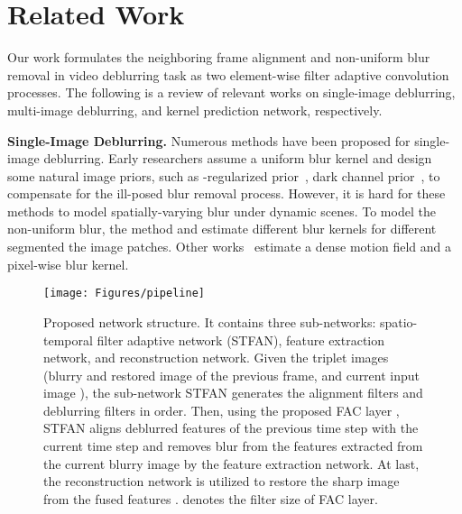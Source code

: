 \documentclass[10pt,twocolumn,letterpaper]{article}
\begin{document}
\section{Related Work}
Our work formulates the neighboring frame alignment and non-uniform blur removal in video deblurring task as two element-wise filter adaptive convolution processes.
The following is a review of relevant works on single-image deblurring, multi-image deblurring, and kernel prediction network, respectively.


\noindent \textbf{Single-Image Deblurring.}
Numerous methods have been proposed for single-image deblurring. Early researchers assume a uniform blur kernel and design some natural image priors, such as -regularized prior~\cite{xu2013unnatural}, dark channel prior~\cite{pan2016blind}, to compensate for the ill-posed blur removal process.
However, it is hard for these methods to model spatially-varying blur under dynamic scenes.
To model the non-uniform blur, the method \cite{hyun2013dynamic} and \cite{pan2016soft} estimate different blur kernels for different segmented the image patches.
Other works~\cite{gong2017motion, sun2015learning, hyun2014segmentation} estimate a dense motion field and a pixel-wise blur kernel.
\begin{figure*}[!]
\centering
\resizebox{0.97\linewidth}{!} {
	\texttt{[image: Figures/pipeline]}
}
\vspace{0mm}
\caption{Proposed network structure. It contains three sub-networks: spatio-temporal filter adaptive network (STFAN), feature extraction network, and reconstruction network.
Given the triplet images (blurry  and restored  image of the previous frame, and current input image ),
the sub-network STFAN generates the alignment filters  and deblurring filters  in order.
Then, using the proposed FAC layer , STFAN aligns deblurred features  of the previous time step with the current time step and removes blur from the features  extracted from the current blurry image by the feature extraction network.
At last, the reconstruction network is utilized to restore the sharp image from the fused features .
 denotes the filter size of FAC layer.}
\label{fig:networks}
\vspace{-1mm}
\end{figure*}
\end{document}
